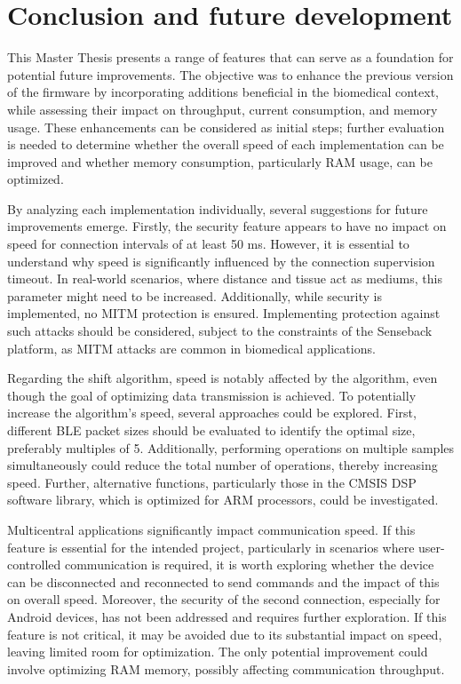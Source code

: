 \documentclass{Configuration_Files/PoliMi3i_thesis}
\begin{document}
\chapter{Conclusion and future development}

This Master Thesis presents a range of features that can serve as a foundation for potential future improvements. The objective was to enhance the previous version of the firmware by incorporating additions beneficial in the biomedical context, while assessing their impact on throughput, current consumption, and memory usage. These enhancements can be considered as initial steps; further evaluation is needed to determine whether the overall speed of each implementation can be improved and whether memory consumption, particularly RAM usage, can be optimized.

By analyzing each implementation individually, several suggestions for future improvements emerge. Firstly, the security feature appears to have no impact on speed for connection intervals of at least 50 ms. However, it is essential to understand why speed is significantly influenced by the connection supervision timeout. In real-world scenarios, where distance and tissue act as mediums, this parameter might need to be increased. Additionally, while security is implemented, no MITM protection is ensured. Implementing protection against such attacks should be considered, subject to the constraints of the Senseback platform, as MITM attacks are common in biomedical applications.

Regarding the shift algorithm, speed is notably affected by the algorithm, even though the goal of optimizing data transmission is achieved. To potentially increase the algorithm's speed, several approaches could be explored. First, different BLE packet sizes should be evaluated to identify the optimal size, preferably multiples of 5. Additionally, performing operations on multiple samples simultaneously could reduce the total number of operations, thereby increasing speed. Further, alternative functions, particularly those in the CMSIS DSP software library, which is optimized for ARM processors, could be investigated.

Multicentral applications significantly impact communication speed. If this feature is essential for the intended project, particularly in scenarios where user-controlled communication is required, it is worth exploring whether the device can be disconnected and reconnected to send commands and the impact of this on overall speed. Moreover, the security of the second connection, especially for Android devices, has not been addressed and requires further exploration. If this feature is not critical, it may be avoided due to its substantial impact on speed, leaving limited room for optimization. The only potential improvement could involve optimizing RAM memory, possibly affecting communication throughput.
\end{document}
